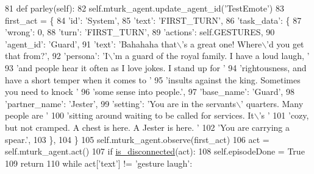 \begin{DoxyCode}
81     \textcolor{keyword}{def }parley(self):
82         self.mturk\_agent.update\_agent\_id(\textcolor{stringliteral}{'TestEmote'})
83         first\_act = \{
84             \textcolor{stringliteral}{'id'}: \textcolor{stringliteral}{'System'},
85             \textcolor{stringliteral}{'text'}: \textcolor{stringliteral}{'FIRST\_TURN'},
86             \textcolor{stringliteral}{'task\_data'}: \{
87                 \textcolor{stringliteral}{'wrong'}: 0,
88                 \textcolor{stringliteral}{'turn'}: \textcolor{stringliteral}{'FIRST\_TURN'},
89                 \textcolor{stringliteral}{'actions'}: self.GESTURES,
90                 \textcolor{stringliteral}{'agent\_id'}: \textcolor{stringliteral}{'Guard'},
91                 \textcolor{stringliteral}{'text'}: \textcolor{stringliteral}{'Bahahaha that\(\backslash\)'s a great one! Where\(\backslash\)'d you get that from?'},
92                 \textcolor{stringliteral}{'persona'}: \textcolor{stringliteral}{'I\(\backslash\)'m a guard of the royal family. I have a loud laugh, '}
93                 \textcolor{stringliteral}{'and people hear it often as I love jokes. I stand up for '}
94                 \textcolor{stringliteral}{'rightousness, and have a short temper when it comes to '}
95                 \textcolor{stringliteral}{'insults against the king. Sometimes you need to knock '}
96                 \textcolor{stringliteral}{'some sense into people.'},
97                 \textcolor{stringliteral}{'base\_name'}: \textcolor{stringliteral}{'Guard'},
98                 \textcolor{stringliteral}{'partner\_name'}: \textcolor{stringliteral}{'Jester'},
99                 \textcolor{stringliteral}{'setting'}: \textcolor{stringliteral}{'You are in the servants\(\backslash\)' quarters. Many people are '}
100                 \textcolor{stringliteral}{'sitting around waiting to be called for services. It\(\backslash\)'s '}
101                 \textcolor{stringliteral}{'cozy, but not cramped. A chest is here. A Jester is here. '}
102                 \textcolor{stringliteral}{'You are carrying a spear.'},
103             \},
104         \}
105         self.mturk\_agent.observe(first\_act)
106         act = self.mturk\_agent.act()
107         \textcolor{keywordflow}{if} \hyperlink{namespacelight__chats_1_1worlds_a43b0aff73307cda95a089763b77f40d3}{is\_disconnected}(act):
108             self.episodeDone = \textcolor{keyword}{True}
109             \textcolor{keywordflow}{return}
110         \textcolor{keywordflow}{while} act[\textcolor{stringliteral}{'text'}] != \textcolor{stringliteral}{'gesture laugh'}:

\end{DoxyCode}
